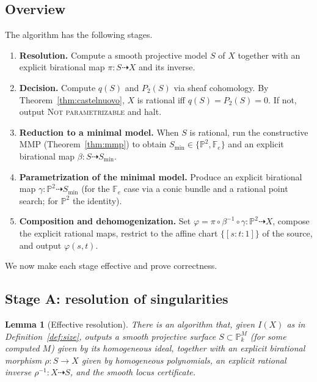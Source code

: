 \documentclass{amsart}
\theoremstyle{plain}
\newtheorem{lemma}{Lemma}
\theoremstyle{definition}
\newcommand{\PP}{\mathbb{P}}
\begin{document}
\subsection{Overview}
The algorithm has the following stages.
\begin{enumerate}
\item[(A)] \textbf{Resolution.}  Compute a smooth projective model $S$ of $X$
together with an explicit birational map $\pi\colon S\dashrightarrow X$ and its
inverse.
\item[(B)] \textbf{Decision.}  Compute $q(S)$ and $P_2(S)$ via sheaf cohomology.
By Theorem~\ref{thm:castelnuovo}, $X$ is rational iff $q(S)=P_2(S)=0$.  If not,
output \textsc{Not parametrizable} and halt.
\item[(C)] \textbf{Reduction to a minimal model.}  When $S$ is rational, run the
constructive MMP (Theorem~\ref{thm:mmp}) to obtain $S_{\min}\in\{\PP^2,
\mathbb{F}_e\}$ and an explicit birational map $\beta\colon
S\dashrightarrow S_{\min}$.
\item[(D)] \textbf{Parametrization of the minimal model.}  Produce an explicit
birational map $\gamma\colon\PP^2\dashrightarrow S_{\min}$ (for the
$\mathbb{F}_e$ case via a conic bundle and a rational point search; for $\PP^2$
the identity).
\item[(E)] \textbf{Composition and dehomogenization.}  Set
$\varphi=\pi\circ\beta^{-1}\circ\gamma\colon\PP^2\dashrightarrow X$, compose the
explicit rational maps, restrict to the affine chart $\{[s:t:1]\}$ of the source,
and output $\varphi(s,t)$.
\end{enumerate}

We now make each stage effective and prove correctness.

\subsection{Stage A: resolution of singularities}

\begin{lemma}[Effective resolution]\label{lem:resolution}
There is an algorithm that, given $I(X)$ as in Definition~\ref{def:size},
outputs a smooth projective surface $S\subset\PP^{M}_k$ (for some computed $M$)
given by its homogeneous ideal, together with an explicit birational morphism
$\rho\colon S\to X$ given by homogeneous polynomials, an explicit rational
inverse $\rho^{-1}\colon X\dashrightarrow S$, and the smooth locus certificate.
\end{lemma}
\end{document}
